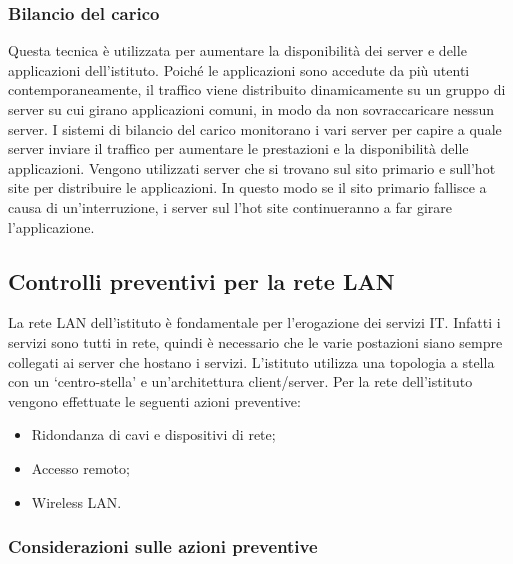 \documentclass[12pt, a4paper, titlepage]{report}
\begin{document}
	\subsubsection{Bilancio del carico}
	
	Questa tecnica è utilizzata per aumentare la disponibilità dei server e delle applicazioni dell'istituto. Poiché le applicazioni sono accedute da più utenti contemporaneamente, il traffico viene distribuito dinamicamente su un gruppo di server su cui girano applicazioni comuni, in modo da non sovraccaricare nessun server. I sistemi di bilancio del carico monitorano i vari server per capire a quale server inviare il traffico per aumentare le prestazioni e la disponibilità delle applicazioni. Vengono utilizzati server che si trovano sul sito primario e sull'hot site per distribuire le applicazioni. In questo modo se il sito primario fallisce a causa di un'interruzione, i server sul l'hot site continueranno a far girare l'applicazione.	
	\newpage
	
	\subsection{Controlli preventivi per la rete LAN} \label{lan}
	
	La rete LAN dell'istituto è fondamentale per l'erogazione dei servizi IT. Infatti i servizi sono tutti in rete, quindi è necessario che le varie postazioni siano sempre collegati ai server che hostano i servizi. L'istituto utilizza una topologia a stella con un `centro-stella' e un'architettura client/server. Per la rete dell'istituto vengono effettuate le seguenti azioni preventive:
	\begin{itemize}
		\item Ridondanza di cavi e dispositivi di rete;
		\item Accesso remoto;
		\item Wireless LAN.
	\end{itemize}
	
	\subsubsection{Considerazioni sulle azioni preventive}
	
\end{document}
